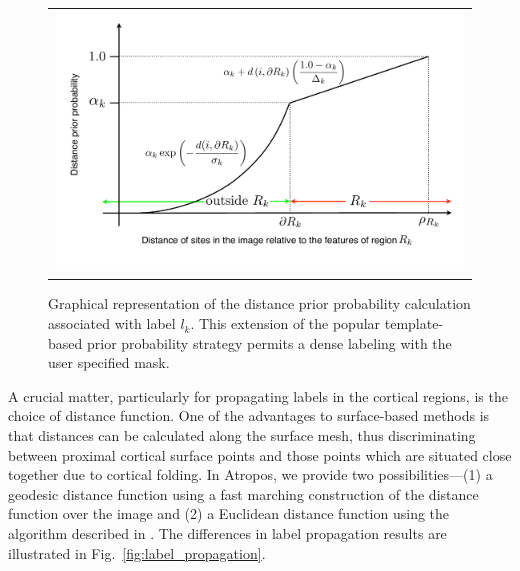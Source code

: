\documentclass[11pt,english]{article}
\begin{document}
\begin{figure}
\begin{center}
\begin{tabular}{c}
\includegraphics[width=150mm]{distancePrior.pdf}
\end{tabular}
\caption{\baselineskip 12pt \small Graphical representation of the distance prior probability calculation associated with label $l_k$.  This extension of the popular template-based prior probability strategy permits a dense labeling with the user specified mask. }
\label{fig:distancePrior}
\end{center}
\end{figure}



A crucial matter, particularly for propagating labels in the cortical regions, is the choice of distance function.  One of the advantages to surface-based methods is that distances can be calculated along the surface mesh, thus discriminating between proximal cortical surface points and those points which are situated close together due to cortical folding.  In Atropos, we provide two possibilities---(1) a geodesic distance function using a fast marching construction \citep{Osher1988} of the distance function over the image and (2) a Euclidean distance function using the algorithm described in \cite{Maurer2003}.  The differences in label propagation results are illustrated in Fig.~\ref{fig:label_propagation}.   
\end{document}
